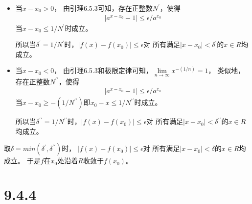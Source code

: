 \documentclass{article}
\begin{document}
\begin{itemize}
  \item  当$x - x_0 > 0$，
        由引理6.5.3可知，存在正整数$N^\prime$，使得
        \begin{align*}
          |a^{x-x_0} - 1| \leq \epsilon / a^{x_0}
        \end{align*}
        当$x-x_0 \leq 1/N^\prime$时成立。

        所以当$\delta^\prime = 1/N^\prime$时，$|f(x) - f(x_0)| \leq \epsilon$对
        所有满足$|x - x_0| < \delta^\prime$的$x \in R$均成立。
  \item 当$x - x_0 < 0$，
        由引理6.5.3和极限定律可知，$\lim\limits_{n \rightarrow \infty} x^{-(1/n)} = 1$，
        类似地，存在正整数$N^{\prime\prime}$，使得
        \begin{align*}
          |a^{x-x_0} - 1| \leq \epsilon / a^{x_0}
        \end{align*}
        当$x-x_0 \geq -(1/N^{\prime\prime})$即$x_0 - x \leq 1/N^{\prime\prime}$时成立。

        所以当$\delta^{\prime\prime} = 1/N^{\prime\prime}$时，$|f(x) - f(x_0)| \leq \epsilon$对
        所有满足$|x - x_0| < \delta^{\prime\prime}$的$x \in R$均成立。
\end{itemize}
取$\delta = min(\delta^\prime, \delta^{\prime\prime})$时，
$|f(x) - f(x_0)| \leq \epsilon$对
所有满足$|x - x_0| < \delta$的$x \in R$均成立。
于是$f$在$x_0$处沿着$R$收敛于$f(x_0)$。

\section*{9.4.4}
\end{document}
